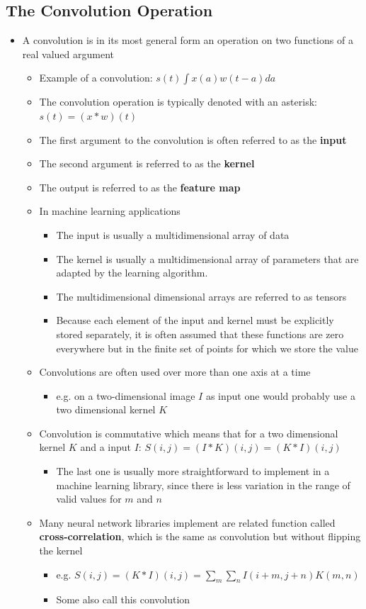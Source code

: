 \documentclass[11pt]{article}
\begin{document}
\subsection{The Convolution Operation}
\label{sec:orgd31b6e0}
\begin{itemize}
\item A convolution is in its most general form an operation on two functions of a real valued argument
\begin{itemize}
\item Example of a convolution: \(s(t) \int x(a)w(t-a)da\)
\item The convolution operation is typically denoted with an asterisk: \(s(t) = (x*w)(t)\)
\item The first argument to the convolution is often referred to as the \textbf{input}
\item The second argument is referred to as the \textbf{kernel}
\item The output is referred to as the \textbf{feature map}
\item In machine learning applications
\begin{itemize}
\item The input is usually a multidimensional array of data
\item The kernel is usually a multidimensional array of parameters that are adapted by the learning algorithm.
\item The multidimensional dimensional arrays are referred to as tensors
\item Because each element of the input and kernel must be explicitly stored separately, it is often assumed that these functions are zero everywhere but in the finite set of points for which we store the value
\end{itemize}
\item Convolutions are often used over more than one axis at a time
\begin{itemize}
\item e.g. on a two-dimensional image \(I\) as input one would probably use a two dimensional kernel \(K\)
\end{itemize}
\item Convolution is commutative which means that for a two dimensional kernel \(K\) and a input \(I\): \(S(i,j) = (I*K)(i,j)=(K*I)(i,j)\)
\begin{itemize}
\item The last one is usually more straightforward to implement in a machine learning library, since there is less variation in the range of valid values for \(m\) and \(n\)
\end{itemize}
\item Many neural network libraries implement are related function called \textbf{cross-correlation}, which is the same as convolution but without flipping the kernel
\begin{itemize}
\item e.g. \(S(i,j) = (K*I)(i,j)= \sum_m\sum_nI(i+m,j+n)K(m,n)\)
\item Some also call this convolution
\end{itemize}
\end{itemize}
\end{itemize}
\end{document}
